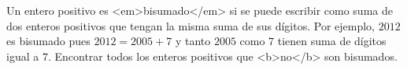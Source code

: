 Un entero positivo es <em>bisumado</em> si se puede escribir como suma de dos enteros positivos que tengan la misma suma de sus dígitos. Por ejemplo, $2012$ es bisumado pues $2012 = 2005+7$ y tanto $2005$ como $7$ tienen suma de dígitos igual a $7$. Encontrar todos los enteros positivos que <b>no</b> son bisumados.
